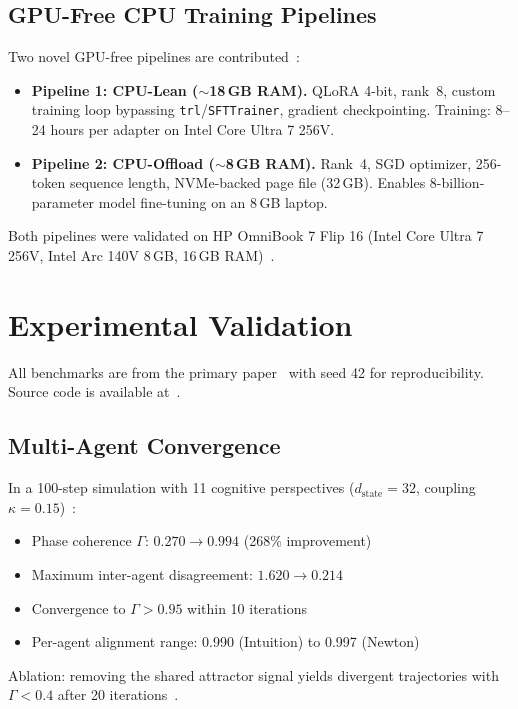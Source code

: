 \documentclass[conference]{IEEEtran}
\begin{document}
\subsection{GPU-Free CPU Training Pipelines}

Two novel GPU-free pipelines are contributed~\cite{harrison2026codettefull}:
\begin{itemize}[leftmargin=*]
  \item \textbf{Pipeline 1: CPU-Lean ($\sim$18\,GB RAM).} QLoRA 4-bit, rank~8, custom training loop bypassing \texttt{trl}/\texttt{SFTTrainer}, gradient checkpointing. Training: 8--24 hours per adapter on Intel Core Ultra 7 256V.
  \item \textbf{Pipeline 2: CPU-Offload ($\sim$8\,GB RAM).} Rank~4, SGD optimizer, 256-token sequence length, NVMe-backed page file (32\,GB). Enables 8-billion-parameter model fine-tuning on an 8\,GB laptop.
\end{itemize}
Both pipelines were validated on HP OmniBook 7 Flip 16 (Intel Core Ultra 7 256V, Intel Arc 140V 8\,GB, 16\,GB RAM)~\cite{harrison2026codettefull}.

\section{Experimental Validation}
\label{sec:experiments}

All benchmarks are from the primary paper~\cite{harrison2026codettefull} with seed 42 for reproducibility. Source code is available at~\cite{harrison2025codettehf}.

\subsection{Multi-Agent Convergence}

In a 100-step simulation with 11 cognitive perspectives ($d_{\text{state}} = 32$, coupling $\kappa = 0.15$)~\cite{harrison2026codettefull}:
\begin{itemize}[leftmargin=*]
  \item Phase coherence $\Gamma$: $0.270 \to 0.994$ (268\% improvement)
  \item Maximum inter-agent disagreement: $1.620 \to 0.214$
  \item Convergence to $\Gamma > 0.95$ within 10 iterations
  \item Per-agent alignment range: 0.990 (Intuition) to 0.997 (Newton)
\end{itemize}
Ablation: removing the shared attractor signal yields divergent trajectories with $\Gamma < 0.4$ after 20 iterations~\cite{harrison2026codettefull}.
\end{document}
